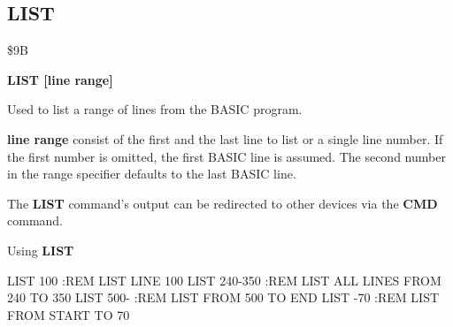 \subsection{LIST}
\begin{description}[leftmargin=3cm,style=nextline]
\item [Token:] \$9B
\item [Format:] {\bf LIST [line range]} \\
\item [Usage:] Used to list
               a range of lines from the BASIC program.

               {\bf line range} consist of the first and the last
               line to list or a single line number.
               If the first number is omitted, the
               first BASIC line is assumed.
               The second number in the range specifier defaults
               to the last BASIC line.

\item [Remarks:] The {\bf LIST} command's output can be redirected
                 to other devices via the {\bf CMD} command.

\item [Example:] Using {\bf LIST}
\begin{screenoutput}
  LIST 100      :REM LIST LINE 100
  LIST 240-350  :REM LIST ALL LINES FROM 240 TO 350
  LIST 500-     :REM LIST FROM 500 TO END
  LIST -70      :REM LIST FROM START TO 70
\end{screenoutput}
\end{description}


\newpage
